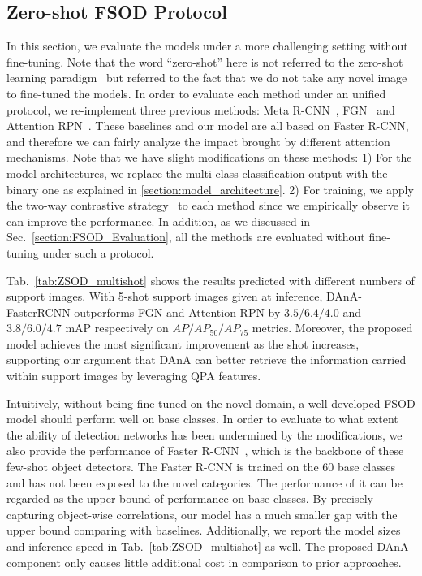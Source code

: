 \documentclass[journal]{IEEEtran}
\begin{document}
\subsection{Zero-shot FSOD Protocol}
In this section, we evaluate the models under a more challenging setting without fine-tuning.
Note that the word ``zero-shot'' here is not referred to the zero-shot learning paradigm~\cite{socher2013zero} but referred to the fact that we do not take any novel image to fine-tuned the models.
In order to evaluate each method under an unified protocol, we re-implement three previous methods: Meta R-CNN~\cite{yan2019meta}, FGN~\cite{fan2020fgn} and Attention RPN~\cite{fan2020few}.
These baselines and our model are all based on Faster R-CNN, and therefore we can fairly analyze the impact brought by different attention mechanisms.
Note that we have slight modifications on these methods: 1) For the model architectures, we replace the multi-class classification output with the binary one as explained in \ref{section:model_architecture}. 2) For training, we apply the two-way contrastive strategy~\cite{fan2020few} to each method since we empirically observe it can improve the performance.
In addition, as we discussed in Sec.~\ref{section:FSOD_Evaluation}, all the methods are evaluated without fine-tuning under such a protocol.


Tab.~\ref{tab:ZSOD_multishot} shows the results predicted with different numbers of support images.
With 5-shot support images given at inference, DAnA-FasterRCNN outperforms FGN and Attention RPN by $3.5/6.4/4.0$ and $3.8/6.0/4.7$ mAP respectively on $AP/AP_{50}/AP_{75}$ metrics.
Moreover, the proposed model achieves the most significant improvement as the shot increases, supporting our argument that DAnA can better retrieve the information carried within support images by leveraging QPA features.


Intuitively, without being fine-tuned on the novel domain, a well-developed FSOD model should perform well on base classes.
In order to evaluate to what extent the ability of detection networks has been undermined by the modifications, we also provide the performance of Faster R-CNN~\cite{ren2015faster}, which is the backbone of these few-shot object detectors. 
The Faster R-CNN is trained on the 60 base classes and has not been exposed to the novel categories.
The performance of it can be regarded as the upper bound of performance on base classes.
By precisely capturing object-wise correlations, our model has a much smaller gap with the upper bound comparing with baselines.
Additionally, we report the model sizes and inference speed in Tab.~\ref{tab:ZSOD_multishot} as well.
The proposed DAnA component only causes little additional cost in comparison to prior approaches.
\end{document}

